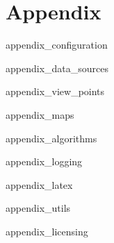 \chapter{Appendix}
\label{sec:appendix}

 {appendix_configuration}

 {appendix_data_sources}

 {appendix_view_points}

 {appendix_maps}

 {appendix_algorithms}

 {appendix_logging}

 {appendix_latex}

 {appendix_utils}

 {appendix_licensing} 

